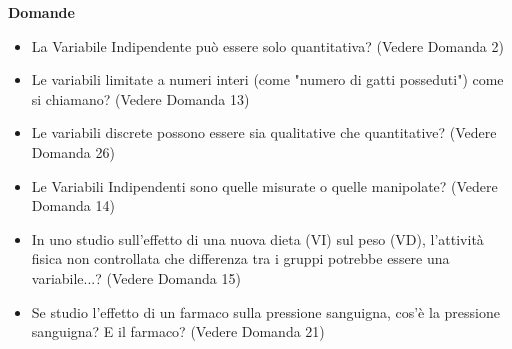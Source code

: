 \documentclass[12pt, a4paper]{article}
\newenvironment{reflectionbox}{%
    \begin{framed}\par\medskip\noindent
    \textbf{\color{boxtitlecolor}Domande} \par
    \begin{itemize}[leftmargin=*, label=$\blacktriangleright$]
}{%
    \end{itemize}\par\medskip
    \end{framed}
}
\begin{document}
\begin{reflectionbox}
    \item La Variabile Indipendente può essere solo quantitativa? (Vedere Domanda 2)
    \item Le variabili limitate a numeri interi (come "numero di gatti posseduti") come si chiamano? (Vedere Domanda 13)
    \item Le variabili discrete possono essere sia qualitative che quantitative? (Vedere Domanda 26)
    \item Le Variabili Indipendenti sono quelle misurate o quelle manipolate? (Vedere Domanda 14)
    \item In uno studio sull'effetto di una nuova dieta (VI) sul peso (VD), l'attività fisica non controllata che differenza tra i gruppi potrebbe essere una variabile...? (Vedere Domanda 15)
    \item Se studio l'effetto di un farmaco sulla pressione sanguigna, cos'è la pressione sanguigna? E il farmaco? (Vedere Domanda 21)
\end{reflectionbox}
\end{document}

